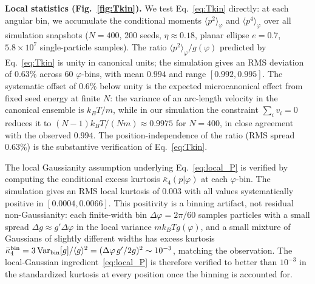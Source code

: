 \documentclass[aps,pre,twocolumn,superscriptaddress,longbibliography,floatfix]{revtex4-2}
\begin{document}
\textbf{Local statistics (Fig.~\ref{fig:Tkin}).}
We test Eq.~\eqref{eq:Tkin} directly: at each angular bin, we accumulate the conditional
moments $\langle p^2\rangle_\varphi$ and $\langle p^4\rangle_\varphi$ over all simulation
snapshots ($N=400$, 200 seeds, $\eta\approx 0.18$, planar ellipse $e=0.7$, $5.8\times 10^7$
single-particle samples).
The ratio $\langle p^2\rangle_\varphi/g(\varphi)$ predicted by Eq.~\eqref{eq:Tkin} is unity
in canonical units; the simulation gives an RMS deviation of $0.63\%$ across $60$
$\varphi$-bins, with mean $0.994$ and range $[0.992,0.995]$.
The systematic offset of $0.6\%$ below unity is the expected microcanonical effect from
fixed seed energy at finite $N$: the variance of an arc-length velocity in the canonical
ensemble is $k_BT/m$, while in our simulation the constraint $\sum_i v_i=0$ reduces it to
$(N-1)k_BT/(Nm)\approx 0.9975$ for $N=400$, in close agreement with the observed $0.994$.
The position-independence of the ratio (RMS spread $0.63\%$) is the substantive verification
of Eq.~\eqref{eq:Tkin}.

The local Gaussianity assumption underlying Eq.~\eqref{eq:local_P} is verified by computing
the conditional excess kurtosis $\bar\kappa_4(p|\varphi)$ at each $\varphi$-bin.
The simulation gives an RMS local kurtosis of $0.003$ with all values systematically
positive in $[0.0004,0.0066]$.
This positivity is a binning artifact, not residual non-Gaussianity: each finite-width bin
$\Delta\varphi=2\pi/60$ samples particles with a small spread $\Delta g\approx g'\Delta\varphi$
in the local variance $mk_BTg(\varphi)$, and a small mixture of Gaussians of slightly
different widths has excess kurtosis
$\bar\kappa_4^{\rm bin}=3\,\mathrm{Var}_{\rm bin}[g]/\langle g\rangle^2 = (\Delta\varphi\,g'/2g)^2\sim 10^{-3}$,
matching the observation.
The local-Gaussian ingredient~\eqref{eq:local_P} is therefore verified to better than
$10^{-3}$ in the standardized kurtosis at every position once the binning is accounted for.
\end{document}

